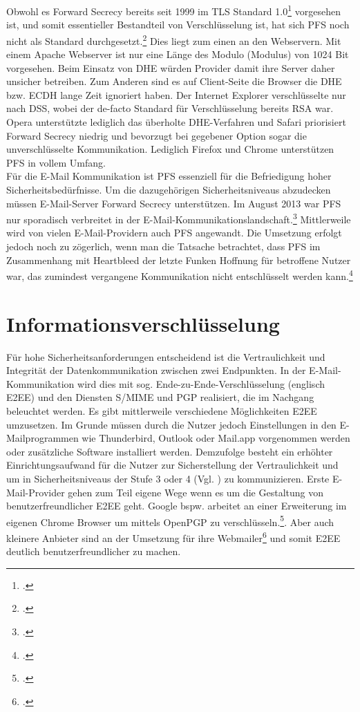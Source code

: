 \documentclass  [paper=a4,
				fontsize=12pt,
				listof=totoc,
				bibliography=totoc
				]{scrreprt}
\begin{document}
				Obwohl es Forward Secrecy bereits seit 1999 im \ac{TLS} Standard 1.0\footcite[Vgl.][]{Boeck2013} vorgesehen ist, und somit essentieller Bestandteil von Verschlüsselung ist, hat sich \ac{PFS} noch nicht als Standard durchgesetzt.\footcite[Vgl.][]{SSLLabs} Dies liegt zum einen an den Webservern. Mit einem Apache Webserver ist nur eine Länge des Modulo (Modulus) von 1024 Bit vorgesehen. Beim Einsatz von \ac{DHE} würden Provider damit ihre Server daher unsicher betreiben. Zum Anderen sind es auf Client-Seite die Browser die \ac{DHE} bzw. \ac{ECDH} lange Zeit ignoriert haben. Der Internet Explorer verschlüsselte nur nach DSS, wobei der de-facto Standard für Verschlüsselung bereits \ac{RSA} war. Opera unterstützte lediglich das überholte \ac{DHE}-Verfahren und Safari priorisiert Forward Secrecy niedrig und bevorzugt bei gegebener Option sogar die unverschlüsselte Kommunikation. Lediglich Firefox und Chrome unterstützen \ac{PFS} in vollem Umfang.\medskip\\
				Für die E-Mail Kommunikation ist \ac{PFS} essenziell für die Befriedigung hoher Sicherheitsbedürfnisse. Um die dazugehörigen Sicherheitsniveaus abzudecken müssen E-Mail-Server Forward Secrecy unterstützen. Im August 2013 war \ac{PFS} nur sporadisch verbreitet in der E-Mail-Kommunikationslandschaft.\footcite[Vgl.][]{Schulz2014} Mittlerweile wird von vielen E-Mail-Providern auch \ac{PFS} angewandt. Die Umsetzung erfolgt jedoch noch zu zögerlich, wenn man die Tatsache betrachtet, dass \ac{PFS} im Zusammenhang mit Heartbleed der letzte Funken Hoffnung für betroffene Nutzer war, das zumindest vergangene Kommunikation nicht entschlüsselt werden kann.\footcite[Vgl.][]{Zhu2014}
		
		\section{Informationsverschlüsselung}
			Für hohe Sicherheitsanforderungen entscheidend ist die Vertraulichkeit und Integrität der Datenkommunikation zwischen zwei Endpunkten. In der E-Mail-Kommunikation wird dies mit sog. Ende-zu-Ende-Verschlüsselung (englisch \ac{E2EE}) und den Diensten \ac{S/MIME} und \ac{PGP} realisiert, die im Nachgang beleuchtet werden.
			Es gibt mittlerweile verschiedene Möglichkeiten \ac{E2EE} umzusetzen. Im Grunde müssen durch die Nutzer jedoch Einstellungen in den E-Mailprogrammen wie Thunderbird, Outlook oder Mail.app vorgenommen werden oder zusätzliche Software installiert werden. Demzufolge besteht ein erhöhter Einrichtungsaufwand für die Nutzer zur Sicherstellung der Vertraulichkeit und um in Sicherheitsniveaus der Stufe 3 oder 4 (Vgl. ) zu kommunizieren.\medskip
			Erste E-Mail-Provider gehen zum Teil eigene Wege wenn es um die Gestaltung von benutzerfreundlicher \ac{E2EE} geht. Google bspw. arbeitet an einer Erweiterung im eigenen Chrome Browser um mittels OpenPGP zu verschlüsseln.\footcite[Vgl.][]{Somogyi2013}. Aber auch kleinere Anbieter sind an der Umsetzung für ihre Webmailer\footcite[Vgl.][]{Posteo2013} und somit \ac{E2EE} deutlich benutzerfreundlicher zu machen. 
			
\end{document}
